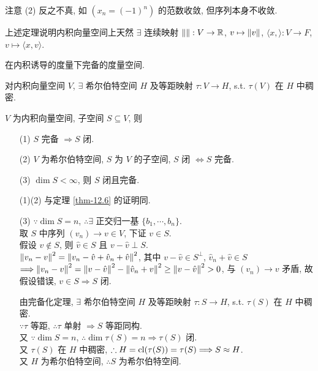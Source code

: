 \documentclass{note}
\begin{document}
注意 (2) 反之不真, 如 $(x_n=(-1)^n)$ 的范数收敛, 但序列本身不收敛.

上述定理说明内积向量空间上天然 $\exists$ 连续映射 $\left\lVert\right\rVert:V\rightarrow\mathbb{R}$, $v\mapsto\left\lVert v\right\rVert$, $\langle x,\rangle:V\rightarrow F$, $v\mapsto\langle x,v\rangle$.

\begin{df}[希尔伯特空间]
    在内积诱导的度量下完备的度量空间.
\end{df}

\begin{thm}
    对内积向量空间 $V$, $\exists$ 希尔伯特空间 $H$ 及等距映射 $\tau:V\rightarrow H$, s.t. $\tau(V)$ 在 $H$ 中稠密.
\end{thm}

\begin{thm}[(课本定理 13.7)]
    $V$ 为内积向量空间, 子空间 $S\subseteq V$, 则
    \begin{itemize}
        \item[(1)] $S$ 完备 $\Longrightarrow S$ 闭.
        \item[(2)] $V$ 为希尔伯特空间, $S$ 为 $V$ 的子空间, $S$ 闭 $\Longleftrightarrow S$ 完备.
        \item[(3)] $\dim S<\infty$, 则 $S$ 闭且完备.
    \end{itemize}
\end{thm}
\begin{pf}
    \begin{itemize}
        \item[(1)(2)] 与定理 \ref{thm-12.6} 的证明同.
        \item[(3)] $\because\dim S=n$, $\therefore\exists$ 正交归一基 $\{b_1,\cdots,b_n\}$.\\
        取 $S$ 中序列 $(v_n)\rightarrow v\in V$, 下证 $v\in S$.\\
        假设 $v\notin S$, 则 $\hat{v}\in S$ 且 $v-\hat{v}\perp S$.\\
        $\left\lVert v_n-v\right\rVert^2=\left\lVert v_n-\hat{v}+\hat{v}_n+\hat{v}\right\rVert^2$, 其中 $v-\hat{v}\in S^{\perp}$, $\hat{v}_n+\hat{v}\in S$\\
        $\Longrightarrow\left\lVert v_n-v\right\rVert^2=\left\lVert v-\hat{v}\right\rVert^2-\left\lVert\hat{v}_n+v\right\rVert^2\geq\left\lVert v-\hat{v}\right\rVert^2>0$, 与 $(v_n)\rightarrow v$ 矛盾, 故假设错误, $v\in S\Longrightarrow S$ 闭.

        由完备化定理, $\exists$ 希尔伯特空间 $H$ 及等距映射 $\tau:S\rightarrow H$, s.t. $\tau(S)$ 在 $H$ 中稠密.\\
        $\because\tau$ 等距, $\therefore\tau$ 单射 $\Longrightarrow S$ 等距同构.\\
        又 $\because\dim S=n$, $\therefore\dim\tau(S)=n\Longrightarrow\tau(S)$ 闭.\\
        又 $\tau(S)$ 在 $H$ 中稠密, $\therefore H=\operatorname{cl}(\tau(S))=\tau(S)\Longrightarrow S\approx H$.\\
        又 $H$ 为希尔伯特空间, $\therefore S$ 为希尔伯特空间.
    \end{itemize}
\end{pf}
\end{document}
